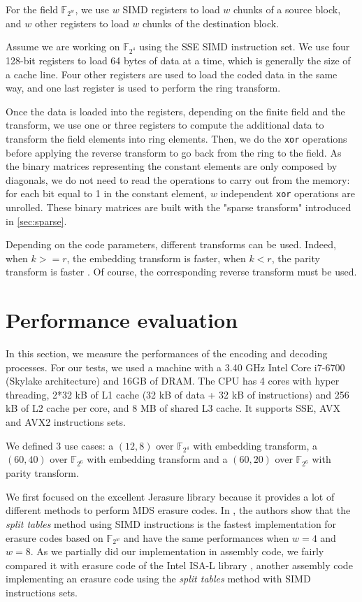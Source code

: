 \documentclass[conference]{IEEEtran}
\begin{document}
For the field $\mathbb{F}_{2^w}$, we use $w$ SIMD registers to load $w$ chunks of a source block, and $w$ other registers to load $w$ chunks of the destination block.

Assume we are working on $\mathbb{F}_{2^4}$ using the SSE SIMD instruction set. We use four 128-bit registers to load 64 bytes of data at a time, which is generally the size of a cache line. Four other registers are used to load the coded data in the same way, and one last register is used to perform the ring transform.

Once the data is loaded into the registers, depending on the finite field and the transform, we use one or three registers to compute the additional data to transform the field elements into ring elements. Then, we do the \texttt{xor} operations before applying the reverse transform to go back from the ring to the field.
As the binary matrices representing the constant elements are only composed by diagonals, we do not need to read the operations to carry out from the memory: for each bit equal to 1 in the constant element, $w$ independent \texttt{xor} operations are unrolled. These binary matrices are built with the "sparse transform" introduced in \ref{sec:sparse}.

Depending on the code parameters, different transforms can be used. Indeed, when $k>=r$, the embedding transform is faster, when $k<r$, the parity transform is faster \cite{isit}. Of course, the corresponding reverse transform must be used.

\section{Performance evaluation}
\label{sec:perf}

In this section, we measure the performances of the encoding and decoding processes. 
For our tests, we used a machine with a 3.40 GHz Intel Core i7-6700 (Skylake architecture) and 16GB of DRAM.
The CPU has 4 cores with hyper threading, 2*32 kB of L1 cache (32 kB of data + 32 kB of instructions) and 256 kB of L2 cache per core, and 8 MB of shared L3 cache.
It supports SSE, AVX and AVX2 instructions sets. 

We defined 3 use cases: a $(12,8)$ over $\mathbb{F}_{2^4}$ with embedding transform, a $(60,40)$ over $\mathbb{F}_{2^6}$ with embedding transform and a $(60,20)$ over $\mathbb{F}_{2^6}$ with parity transform.

We first focused on the excellent Jerasure library \cite{jerasure} because it provides a lot of different methods to perform MDS erasure codes.
In	\cite{pgm:13:sfg}, the authors show that the \textit{split tables} method using SIMD instructions is the fastest implementation for erasure codes based on $\mathbb{F}_{2^w}$ and have the same performances when $w=4$ and $w=8$. 
As we partially did our implementation in assembly code, we fairly compared it with erasure code of the Intel ISA-L library \cite{isal}, another assembly code implementing an erasure code using the \textit{split tables} method with SIMD instructions sets.
\end{document}

